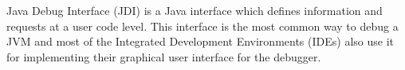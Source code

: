 \documentclass[..thesis.tex]{subfiles}
\begin{document}
Java Debug Interface (JDI) is a Java interface which defines information and requests at a user code level. 
This interface is the most common way to debug a JVM and most of the Integrated Development Environments (IDEs) also use it for implementing their graphical user interface for the debugger.
\end{document}
